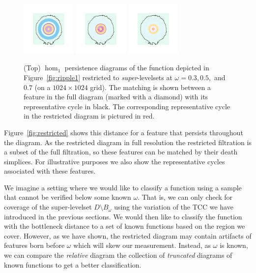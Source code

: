 \begin{figure}[htbp]
  \includegraphics[trim=500 500 500 500, clip, width=0.24\textwidth]{scripts/figures/matching2/surf_top-1_0.png}
  \includegraphics[trim=500 500 500 500, clip, width=0.24\textwidth]{scripts/figures/matching2/surf_top-1_1.png}
  \includegraphics[trim=500 500 500 500, clip, width=0.24\textwidth]{scripts/figures/matching2/surf_top-1_2.png}
  \caption{(Top) $\hom_1$ persistence diagrams of the function depicted in Figure~\ref{fig:ripple1} restricted to \emph{super}-levelsets at $\omega = 0.3, 0.5,$ and $0.7$ (on a $1024\times 1024$ grid).
  The matching is shown between a feature in the full diagram (marked with a diamond) with its representative cycle in black.
  The corresponding representative cycle in the restricted diagram is pictured in red.}
\end{figure}

Figure~\ref{fig:restricted} shows this distance for a feature that persists throughout the diagram.
As the restricted diagram in full resolution the restricted filtration is a subset of the full filtration, so these features can be matched by their death simplices.
For illustrative purposes we also show the representative cycles associated with these features.

We imagine a setting where we would like to classify a function using a sample that cannot be verified below some known $\omega$.
That is, we can only check for coverage of the super-levelset $D\setminus B_\omega$ using the variation of the TCC we have introduced in the previous sections.
We would then like to classify the function with the bottleneck distance to a set of known functions based on the region we cover.
However, as we have shown, the restricted diagram may contain artifacts of features born before $\omega$ which will skew our measurement.
Instead, as $\omega$ is known, we can compare the \emph{relative} diagram the collection of \emph{truncated} diagrams of known functions to get a better classification.

